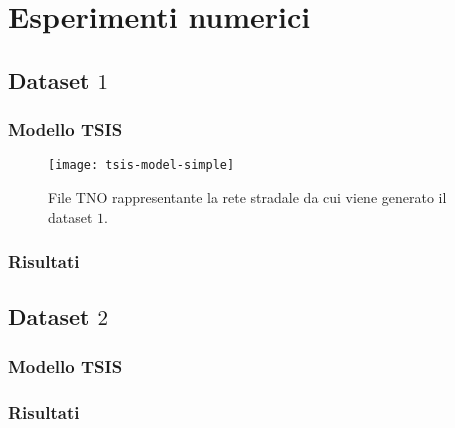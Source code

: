 
\chapter{Esperimenti numerici}
\label{cap:esperimenti}

\omissis{}

\section{Dataset \texorpdfstring{$1$}{1}}
\omissis{}

\subsection{Modello TSIS}

\begin{sidewaysfigure}
\centering
\texttt{[image: tsis-model-simple]}
\caption[Rete stradale del dataset $1$]{File \acs{TNO} rappresentante la rete stradale da cui viene generato il dataset $1$.}
\label{fig:tsis-corsim-arch}
\end{sidewaysfigure}

\subsection{Risultati}
\omissis{}

\section{Dataset \texorpdfstring{$2$}{2}}
\omissis{}

\subsection{Modello TSIS}
\omissis{}

\subsection{Risultati}
\omissis{}
